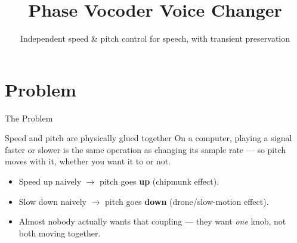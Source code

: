 \documentclass[aspectratio=169]{beamer}
\title[Phase Vocoder Voice Changer]{Phase Vocoder Voice Changer}
\subtitle{Independent speed \& pitch control for speech, with transient preservation}
\institute[CSE220]{CSE220 --- Signals and Systems}
\date{}
\begin{document}
\begin{frame}
  \titlepage
\end{frame}

\section{Problem}
\begin{frame}{The Problem}
  \begin{block}{Speed and pitch are physically glued together}
    On a computer, playing a signal faster or slower is the same operation
    as changing its sample rate --- so pitch moves with it, whether you
    want it to or not.
  \end{block}
  \vspace{0.3cm}
  \begin{itemize}
    \item Speed up naively $\rightarrow$ pitch goes \textbf{up} (chipmunk effect).
    \item Slow down naively $\rightarrow$ pitch goes \textbf{down} (drone/slow-motion effect).
    \item Almost nobody actually wants that coupling --- they want \emph{one}
      knob, not both moving together.
  \end{itemize}
  \vspace{0.3cm}
\end{frame}

\end{document}
